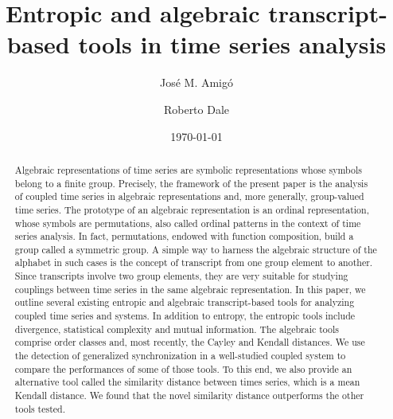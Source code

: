 \documentclass[%
 aip,
 amsmath,amssymb,
 reprint,%
]{revtex4-1}
\begin{document}

\title{Entropic and algebraic transcript-based tools
in time series analysis}
\author{José M. Amigó}
\author{Roberto Dale}%


\date{\today}%

\begin{abstract}

Algebraic representations of time series are symbolic representations whose
symbols belong to a finite group. Precisely, the framework of the present
paper is the analysis of coupled time series in algebraic representations
and, more generally, group-valued time series. The prototype of an algebraic
representation is an ordinal representation, whose symbols are permutations,
also called ordinal patterns in the context of time series analysis. In
fact, permutations, endowed with function composition, build a group called
a symmetric group. A simple way to harness the algebraic structure of the
alphabet in such cases is the concept of transcript from one group element
to another. Since transcripts involve two group elements, they are very
suitable for studying couplings between time series in the same algebraic
representation. In this paper, we outline several existing entropic and algebraic 
transcript-based tools for analyzing coupled time series and systems.
In addition to entropy, the entropic tools include divergence, statistical
complexity and mutual information. The algebraic tools comprise order
classes and, most recently, the Cayley and Kendall distances. We use the detection of generalized synchronization in a well-studied coupled system to compare the performances of some of those tools. To this end,
we also provide an alternative tool called the similarity distance between
times series, which is a mean Kendall distance. We found that the novel similarity distance outperforms the other tools tested.
\end{abstract}
\end{document}
